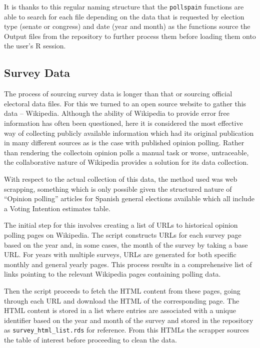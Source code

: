 \documentclass[
  letterpaper,
  DIV=11,
  numbers=noendperiod]{scrreprt}
\begin{document}
It is thanks to this regular naming structure that the
\texttt{pollspain} functions are able to search for each file depending
on the data that is requested by election type (senate or congress) and
date (year and month) as the functions source the Output files from the
repository to further process them before loading them onto the user's R
session.

\hypertarget{survey-data}{%
\subsection{Survey Data}\label{survey-data}}

The process of sourcing survey data is longer than that or sourcing
official electoral data files. For this we turned to an open source
website to gather this data -- Wikipedia. Although the ability of
Wikipedia to provide error free information has often been questioned,
here it is considered the most effective way of collecting publicly
available information which had its original publication in many
different sources as is the case with published opinion polling. Rather
than rendering the collectoin opinion polls a manual task or worse,
untraceable, the collaborative nature of Wikipedia provides a solution
for its data collection.

With respect to the actual collection of this data, the method used was
web scrapping, something which is only possible given the structured
nature of ``Opinion polling'' articles for Spanish general elections
available which all include a Voting Intention estimates table.

The initial step for this involves creating a list of URLs to historical
opinion polling pages on Wikipedia. The script constructs URLs for each
survey page based on the year and, in some cases, the month of the
survey by taking a base URL. For years with multiple surveys, URLs are
generated for both specific monthly and general yearly pages. This
process results in a comprehensive list of links pointing to the
relevant Wikipedia pages containing polling data.

Then the script proceeds to fetch the HTML content from these pages,
going through each URL and download the HTML of the corresponding page.
The HTML content is stored in a list where entries are associated with a
unique identifier based on the year and month of the survey and stored
in the repository as \texttt{survey\_html\_list.rds} for reference. From
this HTMLs the scrapper sources the table of interest before proceeding
to clean the data.
\end{document}
